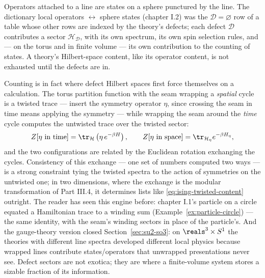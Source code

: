 \begin{iintuition}
\label{int:defect-hilbert}
Operators attached to a line are states on a sphere punctured by the
line. The dictionary local operators $\leftrightarrow$ sphere states
(chapter I.2) was the $\mathcal D = \varnothing$ row of a table whose
other rows are indexed by the theory's defects; each defect $\mathcal
D$ contributes a sector $\mathcal H_{\mathcal D}$, with its own
spectrum, its own spin selection rules, and --- on the torus and in
finite volume --- its own contribution to the counting of states. A
theory's Hilbert-space content, like its operator content, is not
exhausted until the defects are in.
\end{iintuition}

Counting is in fact where defect Hilbert spaces first force themselves
on a calculation. The torus partition function with the seam wrapping
a \emph{spatial} cycle is a twisted trace --- insert the symmetry
operator $\eta$, since crossing the seam in time means applying the
symmetry --- while wrapping the seam around the \emph{time} cycle
computes the untwisted trace over the twisted sector:
\begin{equation}
Z[\eta \text{ in time}] = \tr_{\mathcal H}\left( \eta\, e^{-\beta H}
\right),
\qquad
Z[\eta \text{ in space}] = \tr_{\mathcal H_\eta} e^{-\beta H_\eta},
\label{eq:twisted-traces}
\end{equation}
and the two configurations are related by the Euclidean rotation
exchanging the cycles. Consistency of this exchange --- one set of
numbers computed two ways --- is a strong constraint tying the twisted
spectra to the action of symmetries on the untwisted one; in two
dimensions, where the exchange is the modular transformation of Part
III.4, it determines lists like \eqref{eq:ising-twisted-content}
outright. The reader has seen this engine before: chapter I.1's
particle on a circle equated a Hamiltonian trace to a winding sum
(Example~\ref{ex:particle-circle}) --- the same identity, with the
seam's winding sectors in place of the particle's. And the gauge-theory
version closed Section~\ref{sec:su2-so3}: on $\reals^3 \times S^1$ the
theories with different line spectra developed different local physics
because wrapped lines contribute states/operators that unwrapped
presentations never see. Defect sectors are not exotica; they are
where a finite-volume system stores a sizable fraction of its
information.

